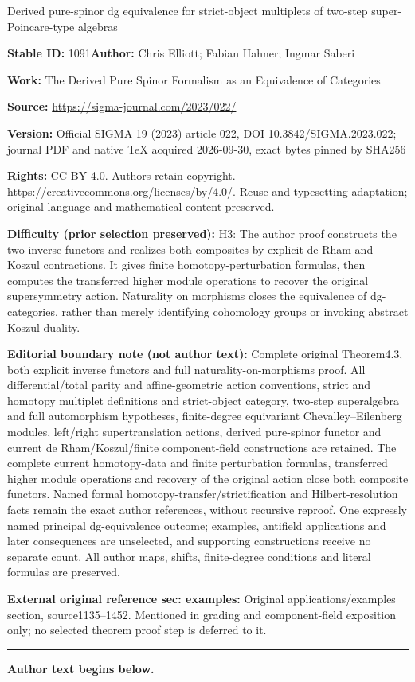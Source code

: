 \documentclass[11pt]{article}
\numberwithin{equation}{section}
\numberwithin{equation}{section}
\begin{document}
\begin{center}\Large Derived pure-spinor dg equivalence for strict-object multiplets of two-step super-Poincare-type algebras\end{center}
\noindent\textbf{Stable ID:} 1091\quad\textbf{Author:} Chris Elliott; Fabian Hahner; Ingmar Saberi\par
\noindent\textbf{Work:} The Derived Pure Spinor Formalism as an Equivalence of Categories\par
\noindent\textbf{Source:} \url{https://sigma-journal.com/2023/022/}\par
\noindent\textbf{Version:} Official SIGMA 19 (2023) article 022, DOI 10.3842/SIGMA.2023.022; journal PDF and native TeX acquired 2026-09-30, exact bytes pinned by SHA256\par
\noindent\textbf{Rights:} CC BY 4.0. Authors retain copyright. \url{https://creativecommons.org/licenses/by/4.0/}. Reuse and typesetting adaptation; original language and mathematical content preserved.\par
\noindent\textbf{Difficulty (prior selection preserved):} {\CJKfont H3: The author proof constructs the two inverse functors and realizes both composites by explicit de Rham and Koszul contractions. It gives finite homotopy-perturbation formulas, then computes the transferred higher module operations to recover the original supersymmetry action. Naturality on morphisms closes the equivalence of dg-categories, rather than merely identifying cohomology groups or invoking abstract Koszul duality.}\par
\medskip\noindent\textbf{Editorial boundary note (not author text):} Complete original Theorem4.3, both explicit inverse functors and full naturality-on-morphisms proof. All differential/total parity and affine-geometric action conventions, strict and homotopy multiplet definitions and strict-object category, two-step superalgebra and full automorphism hypotheses, finite-degree equivariant Chevalley–Eilenberg modules, left/right supertranslation actions, derived pure-spinor functor and current de Rham/Koszul/finite component-field constructions are retained. The complete current homotopy-data and finite perturbation formulas, transferred higher module operations and recovery of the original action close both composite functors. Named formal homotopy-transfer/strictification and Hilbert-resolution facts remain the exact author references, without recursive reproof. One expressly named principal dg-equivalence outcome; examples, antifield applications and later consequences are unselected, and supporting constructions receive no separate count. All author maps, shifts, finite-degree conditions and literal formulas are preserved.\par
\noindent\textbf{External original reference sec: examples:} Original applications/examples section, source1135–1452. Mentioned in grading and component-field exposition only; no selected theorem proof step is deferred to it.\par
\medskip\hrule\medskip\noindent\textbf{Author text begins below.}\par
\setcounter{section}{1}
\end{document}
